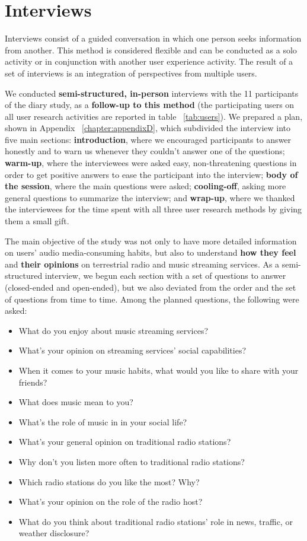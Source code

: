\section{Interviews}

Interviews consist of a guided conversation in which one person seeks information from another. This method is considered flexible and can be conducted as a solo activity or in conjunction with another user experience activity. The result of a set of interviews is an integration of perspectives from multiple users. ~\cite{Courage2005}

We conducted \textbf{semi-structured, in-person} interviews with the 11 participants of the diary study, as a \textbf{follow-up to this method} (the participating users on all user research activities are reported in table ~\ref{tab:users}). We prepared a plan, shown in Appendix ~\ref{chapter:appendixD}, which subdivided the interview into five main sections: \textbf{introduction}, where we encouraged participants to answer honestly and to warn us whenever they couldn't answer one of the questions; \textbf{warm-up}, where the interviewees were asked easy, non-threatening questions in order to get positive answers to ease the participant into the interview; \textbf{body of the session}, where the main questions were asked; \textbf{cooling-off}, asking more general questions to summarize the interview; and \textbf{wrap-up}, where we thanked the interviewees for the time spent with all three user research methods by giving them a small gift.

The main objective of the study was not only to have more detailed information on users' audio media-consuming habits, but also to understand \textbf{how they feel} and \textbf{their opinions} on terrestrial radio and music streaming services. As a semi-structured interview, we begun each section with a set of questions to answer (closed-ended and open-ended), but we also deviated from the order and the set of questions from time to time. Among the planned questions, the following were asked:

\begin{itemize}
  \item What do you enjoy about music streaming services?
  \item What’s your opinion on streaming services’ social capabilities?
  \item When it comes to your music habits, what would you like to share with your friends?
  \item What does music mean to you?
  \item What’s the role of music in in your social life?
  \item What’s your general opinion on traditional radio stations?
  \item Why don’t you listen more often to traditional radio stations?
  \item Which radio stations do you like the most? Why?
  \item What’s your opinion on the role of the radio host?
  \item What do you think about traditional radio stations’ role in news, traffic, or weather disclosure?
\end{itemize}

